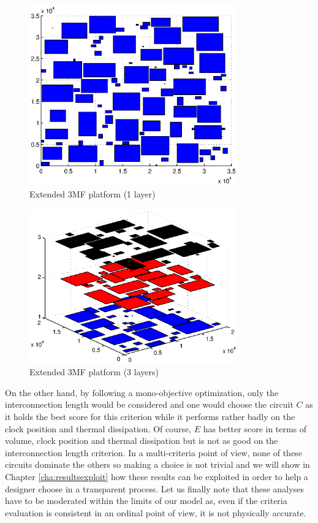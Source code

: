 \begin{figure}[h!]
\begin{center}
\includegraphics[width=0.8\textwidth]{valid1lmandist.eps}
\caption{Extended 3MF platform (1 layer)}
\label{fig:valid1lmandist}
\end{center}
\end{figure}

\begin{figure}[h!]
\begin{center}
\includegraphics[width=0.8\textwidth]{valid3lmandist.eps}
\caption{Extended 3MF platform (3 layers)}
\label{fig:valid3lmandist}
\end{center}
\end{figure}

On the other hand, by following a mono-objective optimization, only the interconnection length would be considered and one would choose the circuit $C$ as it holds the best score for this criterion while it performs rather badly on the clock position and thermal dissipation. Of course, $E$ has better score in terms of volume, clock position and thermal dissipation but is not as good on the interconnection length criterion. In a multi-criteria point of view, none of these circuits dominate the others so making a choice is not trivial and we will show in Chapter \ref{cha:resultsexploit} how these results can be exploited in order to help a designer choose in a transparent process. Let us finally note that these analyses have to be moderated within the limits of our model as, even if the criteria evaluation is consistent in an ordinal point of view, it is not physically accurate.

